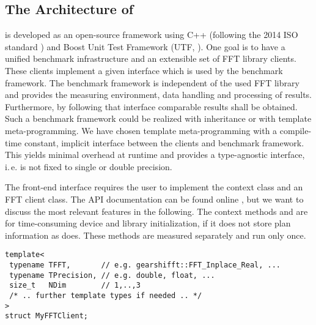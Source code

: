 \subsection{The Architecture of \gearshifft{}}
\label{ssec:gearshifft_arch}
\gearshifft{} is developed as an open-source framework using C++ (following the 2014 ISO standard \cite{cpp14std}) and Boost Unit Test Framework (UTF, \cite{boost}). %
One goal is to have a unified benchmark infrastructure and an extensible set of FFT library clients. 
These clients implement a given interface which is used by the benchmark framework. 
The benchmark framework is independent of the used FFT library and provides the measuring environment, data handling and processing of results.
Furthermore, by following that interface comparable results shall be obtained.
Such a benchmark framework could be realized with inheritance or with template meta-programming. 
We have chosen template meta-programming with a compile-time constant, implicit interface between the clients and benchmark framework.
This yields minimal overhead at runtime and provides a type-agnostic interface, i.\,e. \gearshifft{} is not fixed to single or double precision.


The front-end interface requires the user to implement the context class and an FFT client class. The API documentation can be found online \cite{gearshifft_github}, but we want to discuss the most relevant features in the following. The context methods  and  are for time-consuming device and library initialization, if it does not store plan information as \fftw{} does. These methods are measured separately and run only once. 

\begin{lstlisting}[caption={Required template arguments for FFT client implementation},label={lst:implfft_templ}]
template<
 typename TFFT,       // e.g. gearshifft::FFT_Inplace_Real, ...
 typename TPrecision, // e.g. double, float, ...
 size_t   NDim        // 1,..,3
 /* .. further template types if needed .. */
>
struct MyFFTClient;
\end{lstlisting}

